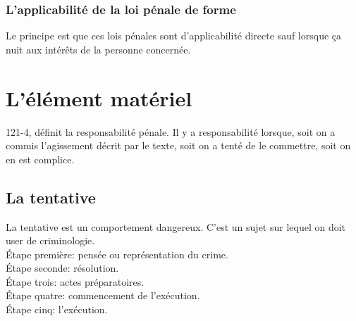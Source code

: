 \documentclass[10pt, a4paper, openany]{book}
\begin{document}
\subsection{L'applicabilité de la loi pénale de forme}

Le principe est que ces lois pénales sont d'applicabilité directe sauf lorsque ça nuit aux intérêts de la personne concernée. 

\chapter{L'élément matériel}

121-4, définit la responsabilité pénale. Il y a responsabilité lorsque, soit on a commis l'agissement décrit par le texte, soit on a tenté de le commettre, soit on en est complice. 

\section{La tentative}

La tentative est un comportement dangereux. C'est un sujet sur lequel on doit user de criminologie. \\
Étape première: pensée ou représentation du crime. \\
Étape seconde: résolution. \\
Étape trois: actes préparatoires. \\
Étape quatre: commencement de l'exécution. \\
Étape cinq: l'exécution. 
\end{document}
